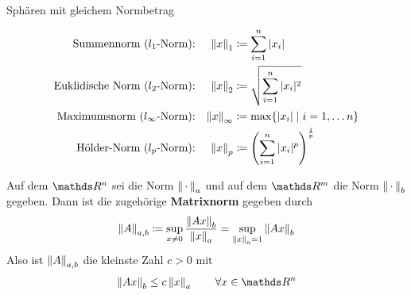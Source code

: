\begin{Wdhe}[Normen]~
  \label{3.2.3}
  \begin{image}{Sphären mit gleichem Normbetrag}
  \end{image}
  
  \begin{align*}
    \text{Summennorm ($l_1$-Norm):} 
    && \nn{x}_1 &\coloneqq \sum_{i=1}^{n}|x_i| 
                  \index{Norm!Summennorm}\\
    \text{Euklidische Norm ($l_2$-Norm):} 
    && \nn{x}_2 &\coloneqq \sqrt{\sum_{i=1}^{n}|x_i|^2}
                  \index{Norm!Euklidische Norm} \\
    \text{Maximumsnorm ($l_\infty$-Norm):} 
    && \nn{x}_\infty &\coloneqq \max\{|x_i| \mid i=1, \ldots n\}
    \index{Norm!Maximumsnorm} \\
    \text{Hölder-Norm ($l_p$-Norm):} 
    && \nn{x}_p &\coloneqq \left(\sum_{i=1}^{n}|x_i|^p\right)^{\frac{1}{p}} 
                  \index{Norm!Hölder-Norm}
  \end{align*}
\end{Wdhe}



\begin{Defe}\label{3.2.4}
  Auf dem $\R^n$  sei die Norm $\left\| \,\cdot\, \right\|_a$ und auf dem $\R^m$ die Norm $\left\| \,\cdot\, \right\|_b$ gegeben.
  Dann ist die zugehörige \textbf{Matrixnorm} 
  gegeben durch
  \begin{gather}
    \left\| A \right\|_{a,b} \coloneqq \sup_{x\neq 0} \frac{\left\| Ax \right\|_b}{\left\| x \right\|_a}
                 = \sup_{\left\| x \right\|_a=1} \left\| Ax \right\|_b \label{III.2.1} 
  \end{gather}
  Also ist   $\left\| A \right\|_{a,b}$ die kleinste Zahl $c>0$ mit
  \begin{gather*}
    \nn{Ax}_b  \leq c\nn{x}_a \quad\quad \forall x\in \R^n
  \end{gather*}
\end{Defe}


